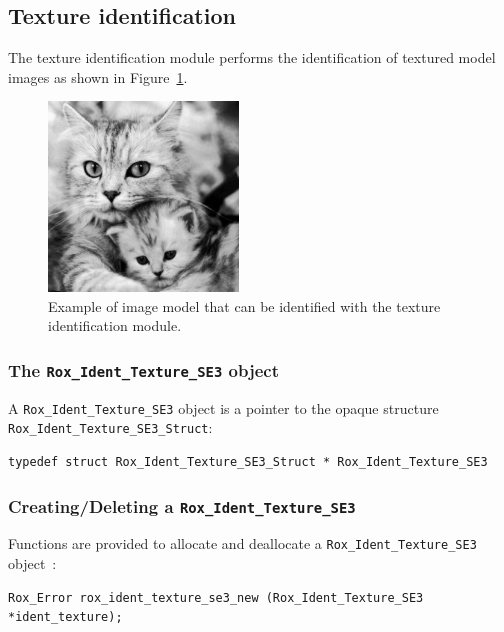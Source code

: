 \subsection{Texture identification}
\label{sse:ident_texture}

\noindent The texture identification module performs the identification of textured model images as shown in Figure~\ref{fig:ident_texture}. 

\begin{figure}[H]
\centering
\includegraphics[width=0.45\textwidth]{vision/figures/ident_phototexture} 
\caption{Example of image model that can be identified with the texture identification module.}
\label{fig:ident_texture}
\end{figure}

\subsubsection{The {\tt Rox\_Ident\_Texture\_SE3} object}
\label{sss:ident_texture_object}
A \lstinline$Rox_Ident_Texture_SE3$ object is a pointer to the opaque structure \lstinline$Rox_Ident_Texture_SE3_Struct$: 

\begin{lstlisting}
typedef struct Rox_Ident_Texture_SE3_Struct * Rox_Ident_Texture_SE3
\end{lstlisting}


\subsubsection{Creating/Deleting a {\tt Rox\_Ident\_Texture\_SE3}}
\label{sss:ident_texture_newdel}

\noindent Functions are provided to allocate and deallocate a \lstinline$Rox_Ident_Texture_SE3$ object~:

\begin{lstlisting}
Rox_Error rox_ident_texture_se3_new (Rox_Ident_Texture_SE3 *ident_texture);
\end{lstlisting}

